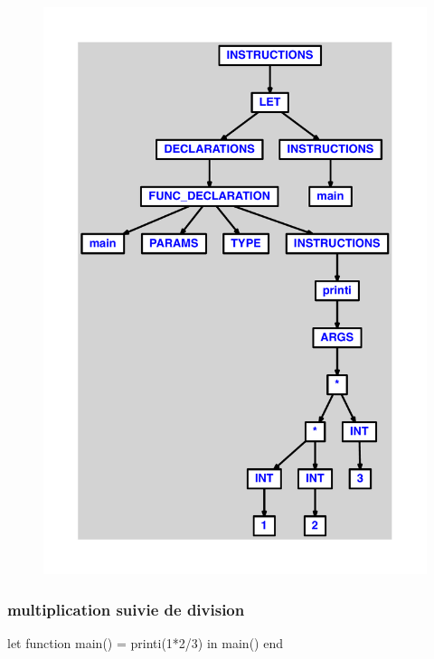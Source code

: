 \documentclass{article}
\begin{document}
\begin{figure}[H]\centering\includegraphics[max width=\textwidth]{ast/ast_49.pdf}\end{figure}\subsubsection{multiplication suivie de division}
\begin{verbatimtab}
let
	function main() = printi(1*2/3)
in main() end
\end{verbatimtab}
\end{document}
